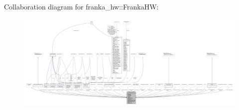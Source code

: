 Collaboration diagram for franka\+\_\+hw\+:\+:Franka\+HW\+:
\nopagebreak
\begin{figure}[H]
\begin{center}
\leavevmode
\includegraphics[width=350pt]{classfranka__hw_1_1FrankaHW__coll__graph}
\end{center}
\end{figure}
